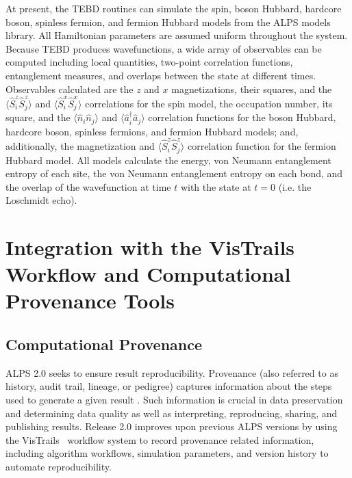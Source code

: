 \documentclass[12pt]{iopart}
\begin{document}
At present, the TEBD routines can simulate the spin, boson Hubbard, hardcore boson, spinless fermion, and fermion Hubbard models from the ALPS models library.  All 
Hamiltonian parameters are assumed uniform throughout the system.  Because TEBD produces wavefunctions, a wide array of observables can be computed including local quantities, two-point correlation functions, entanglement measures, and overlaps between the state at different times.  Observables calculated are the $z$ and $x$ magnetizations, their squares, and the $\langle \hat{S}^z_i 
\hat{S}^z_j\rangle$ and $\langle \hat{S}^x_i \hat{S}^x_j\rangle$ correlations for the spin model, the occupation number, its square, and the $\langle \hat{n}_i \hat{n}_j\rangle$ and 
$\langle \hat{a}_i^{\dagger} \hat{a}_j\rangle$ correlation functions for the boson Hubbard, hardcore boson, spinless fermions, and fermion Hubbard models; and, additionally, 
the magnetization and $\langle \hat{S}^z_i \hat{S}^z_j\rangle$ correlation function for the fermion Hubbard model.  All models calculate the energy, von Neumann entanglement 
entropy of each site, the von Neumann entanglement entropy on each bond, and the overlap of the wavefunction at time $t$ with the state at $t=0$ (i.e. the Loschmidt echo).


\section{Integration with the VisTrails Workflow and Computational Provenance Tools}

\subsection{Computational Provenance}

ALPS 2.0 seeks to ensure result reproducibility.  Provenance (also
referred to as history, audit trail, lineage, or pedigree) captures
information about the steps used to generate a given result
\cite{Silva07,Freire08}.  Such information is crucial in data
preservation and determining data quality as well as interpreting,
reproducing, sharing, and publishing results.  Release 2.0 improves
upon previous ALPS versions by using the VisTrails~\cite{vistrails}
workflow system to record provenance related information, including
algorithm workflows, simulation parameters, and version history to automate
reproducibility.
\end{document}
